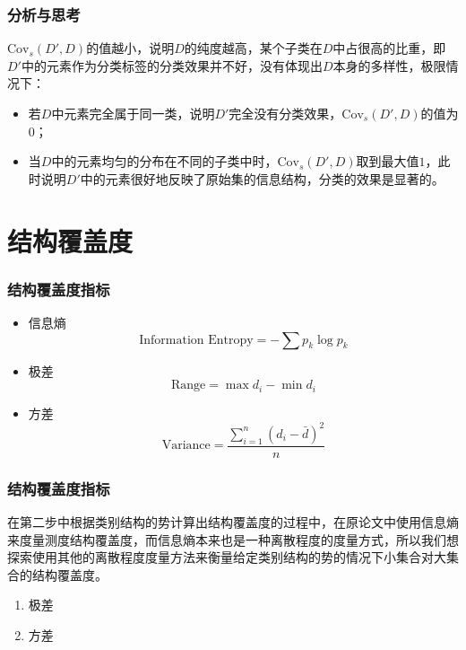 \documentclass{../presentation}
\newcommand{\Cov}{\text{Cov}}
\begin{document}
    \begin{frame}
        \frametitle{分析与思考}

        $\Cov_s(D',D)$的值越小，说明$D$的纯度越高，某个子类在$D$中占很高的比重，即$D'$中的元素作为分类标签的分类效果并不好，没有体现出$D$本身的多样性，极限情况下：

        \begin{itemize}
            \item 若$D$中元素完全属于同一类，说明$D'$完全没有分类效果，$\Cov_s(D',D)$的值为$0$；
            \item 当$D$中的元素均匀的分布在不同的子类中时，$\Cov_s(D',D)$取到最大值$1$，此时说明$D'$中的元素很好地反映了原始集的信息结构，分类的效果是显著的。
        \end{itemize}

    \end{frame}

    \section{结构覆盖度}
    \begin{frame}
        \frametitle{结构覆盖度指标}

        \begin{itemize}
            \item 信息熵
            \begin{equation*}
                \text{Information Entropy}=-\sum p_k \log p_k
            \end{equation*}
            \item 极差
            \begin{equation*}
                \text{Range}=\max d_i−\min d_i
            \end{equation*}
            \item 方差
            \begin{equation*}
                \text{Variance}=\frac{\sum_{i=1}^n \left(d_i - \bar d\right)^2}{n}
            \end{equation*}
        \end{itemize}

    \end{frame}

    \begin{frame}
        \frametitle{结构覆盖度指标}

        在第二步中根据类别结构的势计算出结构覆盖度的过程中，在原论文中使用信息熵来度量测度结构覆盖度，而信息熵本来也是一种离散程度的度量方式，所以我们想探索使用其他的离散程度度量方法来衡量给定类别结构的势的情况下小集合对大集合的结构覆盖度。

        \begin{enumerate}
            \item 极差
            \item 方差
        \end{enumerate}

    \end{frame}
\end{document}
